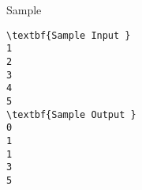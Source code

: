 Sample
\begin{verbatim}
\textbf{Sample Input }
1
2 
3 
4
5 
\textbf{Sample Output }
0
1 
1
3
5
\end{verbatim}